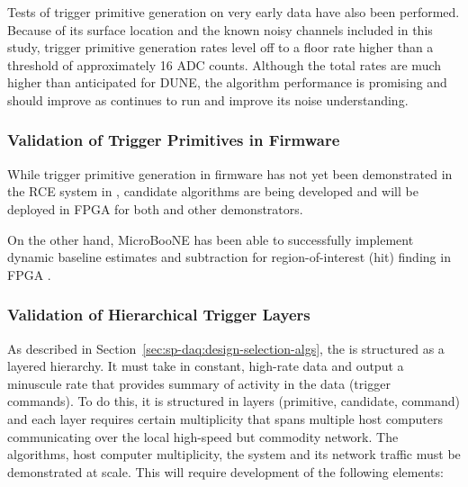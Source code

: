 Tests of trigger primitive generation on very early  data have also been
performed. Because of its surface
location and the known noisy channels included in this study,
 trigger primitive generation rates level off to a floor rate higher than a threshold
of approximately 16 ADC counts. Although the total rates are much higher than
anticipated for DUNE, the algorithm performance is promising and should improve as  continues
to run and improve its noise understanding.

\subsubsection{Validation of Trigger Primitives in Firmware}
\label{sec:sp-daq:validation-firmware-trigger-primitives}

While trigger primitive generation in firmware has not yet been
demonstrated in the RCE system in , candidate
algorithms are being developed and will be deployed in FPGA
for both  and other demonstrators. 

On the other hand, MicroBooNE has been able to
successfully implement dynamic baseline estimates and subtraction
for region-of-interest (hit) finding in FPGA \cite{NNN18}.

\subsubsection{Validation of Hierarchical Trigger Layers}

As described in Section~\ref{sec:sp-daq:design-selection-algs}, the  is structured as a layered hierarchy. 
It must take in constant, high-rate data and output a minuscule rate that provides summary of activity in the data (trigger commands).
To do this, it is structured in layers (primitive, candidate, command) and each layer requires certain multiplicity that spans multiple host computers communicating over the local high-speed but commodity network. 
The algorithms, host computer multiplicity, the  system and its network traffic must be demonstrated at scale.
This will require development of the following elements:

